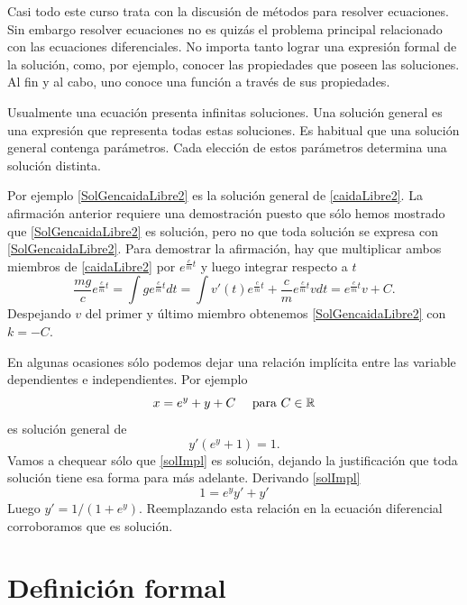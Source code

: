  Casi todo este curso trata con la discusión de métodos para resolver ecuaciones.  
 Sin embargo resolver ecuaciones no es quizás el problema principal relacionado 
 con las ecuaciones diferenciales. No importa tanto lograr una expresión 
 formal de la solución, como, por ejemplo, conocer las propiedades que poseen las soluciones. 
 Al fin y al cabo, uno conoce una función a través de sus propiedades.
 





\begin{definicion} Usualmente una ecuación presenta infinitas soluciones. Una solución general  es una expresión que representa todas estas soluciones. Es habitual que una solución general contenga parámetros. Cada elección de estos parámetros determina una solución distinta.
 \end{definicion}

 Por ejemplo \eqref{SolGencaidaLibre2} es la solución general de \eqref{caidaLibre2}.
  La afirmación anterior requiere una demostración puesto que sólo hemos mostrado que \eqref{SolGencaidaLibre2} es solución, pero no
que toda solución se expresa con \eqref{SolGencaidaLibre2}. Para demostrar la afirmación, hay que multiplicar ambos miembros de \eqref{caidaLibre2} 
por $e^{\frac{c}{m}t}$ y luego integrar respecto a $t$ 
\[\frac{mg}{c}e^{\frac{c}{m}t}=\int ge^{\frac{c}{m}t}dt=\int v'(t)e^{\frac{c}{m}t}+\frac{c}{m}e^{\frac{c}{m}t} vdt=e^{\frac{c}{m}t}v+C.\]
 Despejando $v$ del primer y último miembro obtenemos \eqref{SolGencaidaLibre2} con $k=-C$.

 




\begin{ejemplo} En algunas ocasiones sólo podemos dejar una relación implícita entre las variable dependientes e independientes. Por ejemplo
\begin{equation}\label{solImpl}x=e^y+y+C\quad\text{ para } C\in\rr\end{equation}
es solución general de
\[y'(e^y+1)=1.\]
Vamos a chequear sólo que \eqref{solImpl} es solución, dejando la justificación que toda solución tiene esa forma para más adelante. Derivando \eqref{solImpl}
\[ 1=e^yy'+y'\]
Luego $y'=1/(1+e^{y})$. Reemplazando esta relación  en la ecuación diferencial corroboramos que es solución.
\end{ejemplo}



\section{Definición formal}

